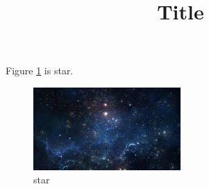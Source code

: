 \documentclass{article}
\title{Title}
\begin{document}
Figure \ref{s} is star.

\begin{figure}[h]
    \centering
    \includegraphics[width=0.5\textwidth]{0_文档/star.jpeg}
    \caption{star}
    \label{s}
\end{figure}
\end{document}
